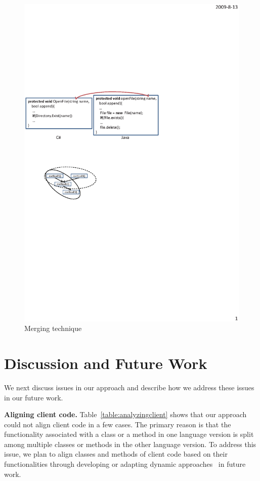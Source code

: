 
\begin{figure}[t]
\centering
\includegraphics[scale=1,clip]{figure/n2n.eps}\vspace*{-3ex}
 \caption{Merging technique}\vspace*{-3.5ex}
 \label{fig:n2n}
\end{figure}

\section{Discussion and Future Work}
\label{sec:discuss}

We next discuss issues in our approach and describe how we address
these issues in our future work.

\textbf{Aligning client code.} Table~\ref{table:analyzingclient}
shows that our approach could not align client code in a few cases.
The primary reason is that the functionality associated with a class
or a method in one language version is split among multiple classes
or methods in the other language version. To address this issue, we
plan to align classes and methods of client code based on their
functionalities through developing or adapting dynamic approaches~\cite{jiang2009automatic} in future work.

